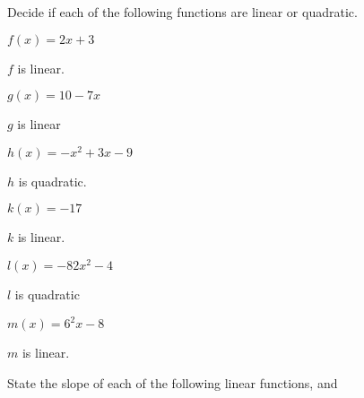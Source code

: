  	 	 	
 	 	 	
 	 	 	
 	\begin{exercises}
 	\begin{problem}
 	Decide if each of the following functions are linear or quadratic.
 	\begin{multicols}{3}
 		\begin{subproblem}
 			$f(x)=2x+3$
 			\begin{shortsolution}
 				$f$ is linear.
 			\end{shortsolution}
 		\end{subproblem}
 		\begin{subproblem}
 			$g(x)=10-7x$
 			\begin{shortsolution}
 				$g$ is linear
 			\end{shortsolution}
 		\end{subproblem}
 		\begin{subproblem}
 			$h(x)=-x^2+3x-9$
 			\begin{shortsolution}
 				$h$ is quadratic.
 			\end{shortsolution}
 		\end{subproblem}
 		\begin{subproblem}
 			$k(x)=-17$
 			\begin{shortsolution}
 				$k$ is linear.
 			\end{shortsolution}
 		\end{subproblem}
 		\begin{subproblem}
 			$l(x)=-82x^2-4$
 			\begin{shortsolution}
 				$l$ is quadratic
 			\end{shortsolution}
 		\end{subproblem}
 		\begin{subproblem}
 			$m(x)=6^2x-8$
 			\begin{shortsolution}
 				$m$ is linear.
 			\end{shortsolution}
 		\end{subproblem}
 	\end{multicols}
 	\end{problem}
 	\begin{problem}
 	State the slope of each of the following linear functions, and

\end{problem}
\end{exercises}
